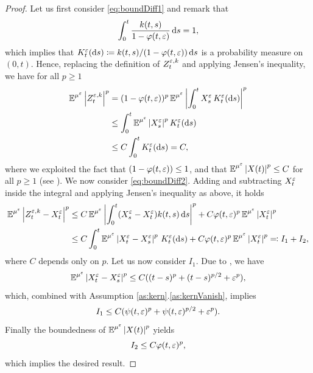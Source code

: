\documentclass[10pt]{article}
\begin{document}
\begin{proof} Let us first consider \eqref{eq:boundDiff1} and remark that
	\begin{equation}
		\int_0^t \frac{k(t, s)}{1 - \varphi(t, \varepsilon)} \,\mathrm{d} s = 1,
	\end{equation}
	which implies that $K^\varepsilon_t(\mathrm{d} s) \coloneqq k(t, s) / (1 - \varphi(t, \varepsilon)) \,\mathrm{d} s$ is a probability measure on $(0, t)$. Hence, replacing the definition of $Z_t^{\varepsilon, k}$ and applying Jensen's inequality, we have for all $p \geq 1$
	\begin{equation}
	\begin{aligned}
		\operatorname{\mathbb{E}}^{\mu^\varepsilon} \left\lvert Z_t^{\varepsilon, k}\right\rvert^p &= (1 - \varphi(t, \varepsilon))^p \operatorname{\mathbb{E}}^{\mu^\varepsilon} \left\lvert\int_0^t X^\varepsilon_s \, K^\varepsilon_t (\mathrm{d} s)\right\rvert^p\\
		&\leq \int_0^t \operatorname{\mathbb{E}}^{\mu^\varepsilon} \left\lvert X^\varepsilon_s\right\rvert^p K^\varepsilon_t (\mathrm{d} s) \\
		&\leq C\int_0^t  K^\varepsilon_t (\mathrm{d} s) = C,
	\end{aligned}
	\end{equation}
	where we exploited the fact that $(1 - \varphi(t, \varepsilon)) \leq 1$, and that $\operatorname{\mathbb{E}}^{\mu^\varepsilon}\left\lvert X(t)\right\rvert^p \leq C$ for all $p \geq 1$ (see \cite[Corollary 5.4]{PaS07}). We now consider \eqref{eq:boundDiff2}. Adding and subtracting $X_t^\varepsilon$ inside the integral and applying Jensen's inequality as above, it holds
	\begin{equation}
	\begin{aligned}
			\operatorname{\mathbb{E}}^{\mu^\varepsilon} \left\lvert Z_t^{\varepsilon, k} - X_t^\varepsilon\right\rvert^p &\leq C \operatorname{\mathbb{E}}^{\mu^\varepsilon} \left\lvert\int_0^t(X_s^\varepsilon - X_t^\varepsilon) k(t, s) \,\mathrm{d} s\right\rvert^p + C \varphi(t, \varepsilon)^p \operatorname{\mathbb{E}}^{\mu^\varepsilon} \left\lvert X_t^\varepsilon\right\rvert^p\\
			&\leq C \int_0^t \operatorname{\mathbb{E}}^{\mu^\varepsilon} \left\lvert X_t^\varepsilon - X_s^\varepsilon\right\rvert^p \, K_t^\varepsilon(\mathrm{d} s) + C \varphi(t, \varepsilon)^p \operatorname{\mathbb{E}}^{\mu^\varepsilon} \left\lvert X_t^\varepsilon\right\rvert^p \eqqcolon I_1 + I_2,
	\end{aligned}
	\end{equation}
	where $C$ depends only on $p$. Let us now consider $I_1$. Due to \cite[Lemma 6.1]{PaS07}, we have
	\begin{equation}
		\operatorname{\mathbb{E}}^{\mu^\varepsilon} \left\lvert X_t^\varepsilon - X_s^\varepsilon\right\rvert^p \leq C((t-s)^p + (t-s)^{p/2} + \varepsilon^p), 
	\end{equation}
	which, combined with Assumption \ref{as:kern}.\ref{as:kernVanish}, implies
	\begin{equation}
		I_1 \leq C(\psi(t, \varepsilon)^p + \psi(t, \varepsilon)^{p/2} + \varepsilon^p).
	\end{equation}
	Finally the boundedness of $\operatorname{\mathbb{E}}^{\mu^\varepsilon}\left\lvert X(t)\right\rvert^p$ yields
	\begin{equation}
		I_2 \leq C\varphi(t, \varepsilon)^p,
	\end{equation}
	which implies the desired result.
\end{proof}
\end{document}
